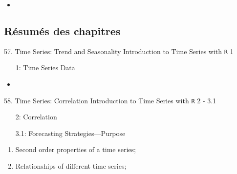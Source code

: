 \documentclass[12pt, titlepage, french]{report}
\begin{document}
\begin{ASM_chapter}
\begin{itemize}
	\item[]	
	\item[]	
	\item[]	
	\item[]	
	\item[]	
	\item[]	
	\item[]	
	\item[]	
\end{itemize}
\end{ASM_chapter}

\begin{YTB_vids}
\begin{itemize}
	\item	
\end{itemize}
\end{YTB_vids}

\subsection{Résumés des chapitres}

\begin{CHPT_SUMM_AUTO}[label = {L.-57}]{57. Time Series: Trend and Seasonality}
Introduction to Time Series with \texttt{R} 1
\begin{itemize}
	\item[1:]	Time Series Data
\end{itemize}
\tcbline
	\begin{itemize}
		\item	
	\end{itemize}
\end{CHPT_SUMM_AUTO}

\begin{CHPT_SUMM_AUTO}[label = {L.-58}]{58. Time Series: Correlation}
Introduction to Time Series with \texttt{R} 2 - 3.1
\begin{itemize}
	\item[2:]	Correlation
	\item[3.1:]	Forecasting Strategies---Purpose
\end{itemize}
\tcbline
	\begin{enumerate}
		\item	Second order properties of a time series;
		\item	Relationships of different time series;
	\end{enumerate}
\end{CHPT_SUMM_AUTO}
\end{document}

